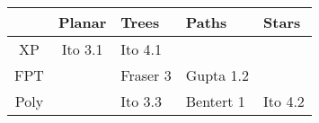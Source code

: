 
\renewcommand{\arraystretch}{1.5}
\begin{tabularx}{\textwidth}{|c||c|Y|Y|Y|}
	\hline

	&
	Planar &
	Trees &
	Paths &
	Stars \\

	\hline
	\hline

	XP &
	 Ito 3.1 &
	 Ito 4.1 &
	 &
	 \\

	\hline

	FPT &
	 &
	 Fraser 3 &
	 Gupta 1.2 &
	 \\

	\hline

	Poly &
	 &
	 Ito 3.3 &
	 Bentert 1 &
	 Ito 4.2 \\

	\hline
\end{tabularx}
\renewcommand{\arraystretch}{1}